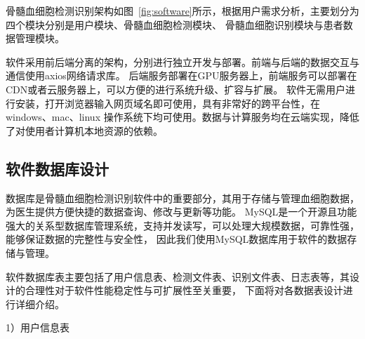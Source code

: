 骨髓血细胞检测识别架构如图~\ref{fig:software}所示，根据用户需求分析，主要划分为四个模块分别是用户模块、骨髓血细胞检测模块、
骨髓血细胞识别模块与患者数据管理模块。

软件采用前后端分离的架构，分别进行独立开发与部署。前端与后端的数据交互与通信使用axios网络请求库。
后端服务部署在GPU服务器上，前端服务可以部署在CDN或者云服务器上，可以方便的进行系统升级、扩容与扩展。
软件无需用户进行安装，打开浏览器输入网页域名即可使用，具有非常好的跨平台性，在windows、mac、linux
操作系统下均可使用。数据与计算服务均在云端实现，降低了对使用者计算机本地资源的依赖。

\subsection{软件数据库设计}
数据库是骨髓血细胞检测识别软件中的重要部分，其用于存储与管理血细胞数据，为医生提供方便快捷的数据查询、修改与更新等功能。
MySQL是一个开源且功能强大的关系型数据库管理系统，支持并发读写，可以处理大规模数据，可靠性强，能够保证数据的完整性与安全性，
因此我们使用MySQL数据库用于软件的数据存储与管理。

软件数据库表主要包括了用户信息表、检测文件表、识别文件表、日志表等，其设计的合理性对于软件性能稳定性与可扩展性至关重要，
下面将对各数据表设计进行详细介绍。

1）用户信息表

